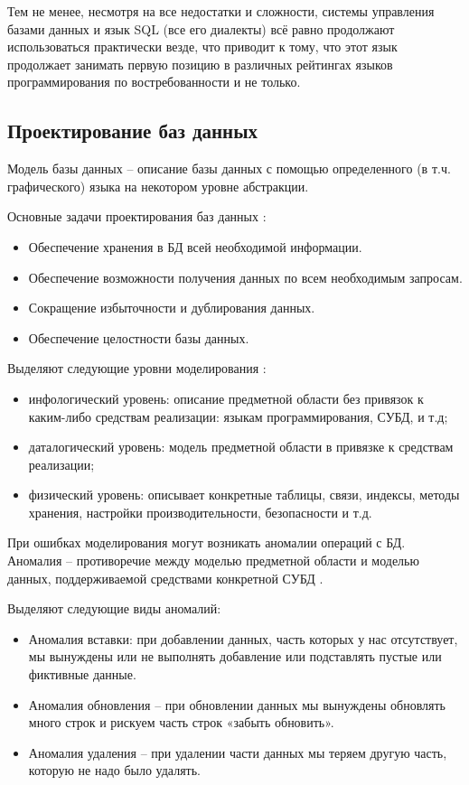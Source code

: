 Тем не менее, несмотря на все недостатки и сложности, системы управления базами данных и язык SQL (все его диалекты) всё равно продолжают использоваться практически везде, что приводит к тому, что этот язык продолжает занимать первую позицию в различных рейтингах языков программирования по востребованности и не только. 

\subsection{Проектирование баз данных}

Модель базы данных -- описание базы данных с помощью  определенного (в т.ч. графического) языка на некотором уровне абстракции.

Основные задачи проектирования баз данных \cite{wiki_db_modelling}:
\begin{itemize}
	\item Обеспечение хранения в БД всей необходимой информации.
	\item Обеспечение возможности получения данных по всем необходимым запросам.
	\item Сокращение избыточности и дублирования данных.
	\item Обеспечение целостности базы данных.
\end{itemize}

Выделяют следующие уровни моделирования \cite{kulikov_db_workbook}:
\begin{itemize}
	\item инфологический уровень: описание предметной области без привязок к каким-либо средствам реализации: языкам программирования, СУБД, и т.д;
	\item даталогический уровень: модель предметной области в привязке к средствам реализации;
	\item физический уровень: описывает конкретные таблицы, связи, индексы, методы хранения, настройки производительности, безопасности и т.д.
\end{itemize}

При ошибках моделирования могут возникать аномалии операций с БД. Аномалия -- противоречие между моделью предметной области и моделью данных, поддерживаемой средствами конкретной СУБД \cite{kulikov_db_workbook}.

Выделяют следующие виды аномалий:
\begin{itemize}
	\item Аномалия вставки: при добавлении данных, часть которых у нас отсутствует, мы вынуждены или не выполнять добавление или подставлять пустые или фиктивные данные.
	\item Аномалия обновления – при обновлении данных мы вынуждены обновлять много строк и рискуем часть строк «забыть обновить».
	\item Аномалия удаления – при удалении части данных мы теряем другую часть, которую не надо было удалять.
\end{itemize}

